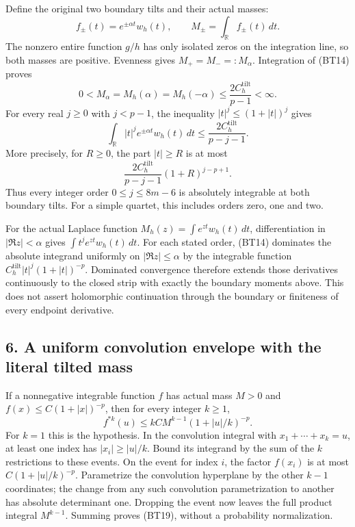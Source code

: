 \documentclass[11pt,a4paper]{article}
\begin{document}
Define the original two boundary tilts and their actual masses: \[
f_\pm(t)=e^{\pm\alpha t}w_h(t),\qquad
M_\pm=\int_{\mathbb R}f_\pm(t)\,dt.
\tag{BT15}
\] The nonzero entire function \(g/h\) has only isolated zeros on the integration line, so both masses are positive. Evenness gives \(M_+=M_-=:M_\alpha\). Integration of (BT14) proves \[
\boxed{
0<M_\alpha=M_h(\alpha)=M_h(-\alpha)
\le\frac{2C_h^{\mathrm{tilt}}}{p-1}<\infty.}
\tag{BT16}
\] For every real \(j\ge0\) with \(j<p-1\), the inequality \(|t|^j\le(1+|t|)^j\) gives \[
\int_{\mathbb R}|t|^j e^{\pm\alpha t}w_h(t)\,dt
\le\frac{2C_h^{\mathrm{tilt}}}{p-j-1}.
\tag{BT17}
\] More precisely, for \(R\ge0\), the part \(|t|\ge R\) is at most \[
\frac{2C_h^{\mathrm{tilt}}}{p-j-1}
(1+R)^{j-p+1}.
\tag{BT18}
\] Thus every integer order \(0\le j\le8m-6\) is absolutely integrable at both boundary tilts. For a simple quartet, this includes orders zero, one and two.

For the actual Laplace function \(M_h(z)=\int e^{zt}w_h(t)\,dt\), differentiation in \(|\Re z|<\alpha\) gives \(\int t^j e^{zt}w_h(t)\,dt\). For each stated order, (BT14) dominates the absolute integrand uniformly on \(|\Re z|\le\alpha\) by the integrable function \(C_h^{\mathrm{tilt}}|t|^j(1+|t|)^{-p}\). Dominated convergence therefore extends those derivatives continuously to the closed strip with exactly the boundary moments above. This does not assert holomorphic continuation through the boundary or finiteness of every endpoint derivative.

\subsection{6. A uniform convolution envelope with the literal tilted mass}\label{bt:a-uniform-convolution-envelope-with-the-literal-tilted-mass}

If a nonnegative integrable function \(f\) has actual mass \(M>0\) and \(f(x)\le C(1+|x|)^{-p}\), then for every integer \(k\ge1\), \[
\boxed{
f^{*k}(u)\le kCM^{k-1}(1+|u|/k)^{-p}.}
\tag{BT19}
\] For \(k=1\) this is the hypothesis. In the convolution integral with \(x_1+\cdots+x_k=u\), at least one index has \(|x_i|\ge|u|/k\). Bound its integrand by the sum of the \(k\) restrictions to these events. On the event for index \(i\), the factor \(f(x_i)\) is at most \(C(1+|u|/k)^{-p}\). Parametrize the convolution hyperplane by the other \(k-1\) coordinates; the change from any such convolution parametrization to another has absolute determinant one. Dropping the event now leaves the full product integral \(M^{k-1}\). Summing proves (BT19), without a probability normalization.
\end{document}
